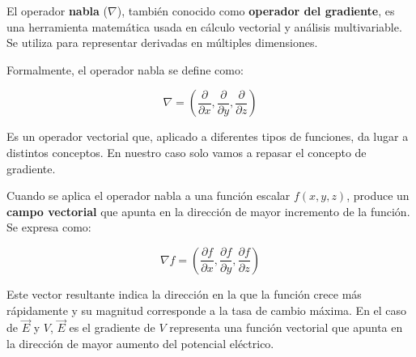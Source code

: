 El operador \textbf{nabla} (\(\nabla\)), también conocido como \textbf{operador del gradiente}, es una herramienta matemática usada en cálculo vectorial y análisis multivariable. Se utiliza para representar derivadas en múltiples dimensiones.

Formalmente, el operador nabla se define como:

\[
\nabla = \left( \frac{\partial}{\partial x}, \frac{\partial}{\partial y}, \frac{\partial}{\partial z} \right)
\]

Es un operador vectorial que, aplicado a diferentes tipos de funciones, da lugar a distintos conceptos. En nuestro caso solo vamos a repasar el concepto de gradiente.

Cuando se aplica el operador nabla a una función escalar \( f(x, y, z) \), produce un \textbf{campo vectorial} que apunta en la dirección de mayor incremento de la función. Se expresa como:

\[
\nabla f = \left( \frac{\partial f}{\partial x}, \frac{\partial f}{\partial y}, \frac{\partial f}{\partial z} \right)
\]

Este vector resultante indica la dirección en la que la función crece más rápidamente y su magnitud corresponde a la tasa de cambio máxima. En el caso de \(\vec{E}\) y \(V\), \(\vec{E}\) es el gradiente de \(V\) representa una función vectorial que apunta en la dirección de mayor aumento del potencial eléctrico.